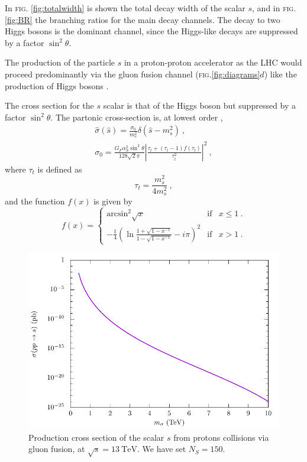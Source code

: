 \documentclass[aps,prd,preprintnumbers,nofootinbibn,twocolumn]{revtex4}
\begin{document}
In \textsc{fig.} \ref{fig:totalwidth} is shown the total decay width of the scalar $s$, and in \textsc{fig.} \ref{fig:BR} the branching ratios for the main decay channels. The decay to two Higgs bosons is the dominant channel, since the Higgs-like decays are suppressed by a factor $\sin^2\theta$.


The production of the particle $s$ in a proton-proton accelerator as the LHC would proceed predominantly via the gluon fusion channel (\textsc{fig.}\ref{fig:diagrams}$d$) like the production of Higgs bosons \cite{Dittmaier:2011ti}.

The cross section for the $s$ scalar is that of the Higgs boson but suppressed by a factor $\sin^2\theta$. The partonic cross-section is, at lowest order \cite{Spira:1995rr},
\begin{align}
\hat{\sigma}(\hat{s}) = \frac{\sigma_0}{m_s^2}\delta(\hat{s}-m_s^2)\ ,\nonumber\\
\sigma_0 = \frac{G_F \alpha_S^2 \sin^2 \theta}{128\sqrt{2} \pi} \left|\frac{\tau_t + (\tau_t-1)f(\tau_t)}{\tau_t^2}  \right|^2\ ,
\end{align}
where $\tau_t$ is defined as
\begin{equation}
\tau_t =  \frac{m_s^2}{4m_s^2}\ ,
\end{equation}
and the function $f(x)$ is given by
\begin{equation}
f(x)= \left\{ \begin{array}{lcc}
\mathrm{arcsin}^2 \sqrt{x} & \mathrm{if} & x \leq 1\ .\\
-\frac{1}{4}\left(\ln \frac{1+\sqrt{1-x^{-1}}}{1-\sqrt{1-x^{-1}}}-i\pi\right)^2 & \mathrm{if} & x>1\ .
\end{array} \right.
\end{equation}

\begin{figure}[t]
\centering
\includegraphics[width=\columnwidth]{crossec}
\caption{Production cross section of the scalar $s$ from protons collisions via gluon fusion, at $\sqrt{s} = \SI{13}{\tera\electronvolt}$. We have set $N_S=150$.}\label{fig:crossect}
\end{figure}
\end{document}
